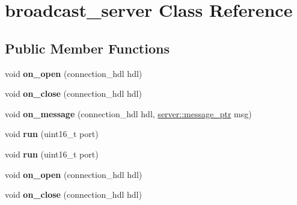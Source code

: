 \hypertarget{classbroadcast__server}{}\section{broadcast\+\_\+server Class Reference}
\label{classbroadcast__server}
\subsection*{Public Member Functions}
\begin{DoxyCompactItemize}
\item 
void {\bfseries on\+\_\+open} (connection\+\_\+hdl hdl)\hypertarget{classbroadcast__server_a20d3e5b15b9e916f6772d3e1137327c0}{}\label{classbroadcast__server_a20d3e5b15b9e916f6772d3e1137327c0}

\item 
void {\bfseries on\+\_\+close} (connection\+\_\+hdl hdl)\hypertarget{classbroadcast__server_aba6fc18682e45978ae64ed1667deb44e}{}\label{classbroadcast__server_aba6fc18682e45978ae64ed1667deb44e}

\item 
void {\bfseries on\+\_\+message} (connection\+\_\+hdl hdl, \hyperlink{classwebsocketpp_1_1endpoint_a585ecbbfd9689d4e4229e4c8378bd672}{server\+::message\+\_\+ptr} msg)\hypertarget{classbroadcast__server_aa56cb8528f19afc3b1a2712d07d0b499}{}\label{classbroadcast__server_aa56cb8528f19afc3b1a2712d07d0b499}

\item 
void {\bfseries run} (uint16\+\_\+t port)\hypertarget{classbroadcast__server_af7c28eeb788bf2451364e76a02615cac}{}\label{classbroadcast__server_af7c28eeb788bf2451364e76a02615cac}

\item 
void {\bfseries run} (uint16\+\_\+t port)\hypertarget{classbroadcast__server_af7c28eeb788bf2451364e76a02615cac}{}\label{classbroadcast__server_af7c28eeb788bf2451364e76a02615cac}

\item 
void {\bfseries on\+\_\+open} (connection\+\_\+hdl hdl)\hypertarget{classbroadcast__server_a20d3e5b15b9e916f6772d3e1137327c0}{}\label{classbroadcast__server_a20d3e5b15b9e916f6772d3e1137327c0}

\item 
void {\bfseries on\+\_\+close} (connection\+\_\+hdl hdl)\hypertarget{classbroadcast__server_aba6fc18682e45978ae64ed1667deb44e}{}\label{classbroadcast__server_aba6fc18682e45978ae64ed1667deb44e}


\end{DoxyCompactItemize}

